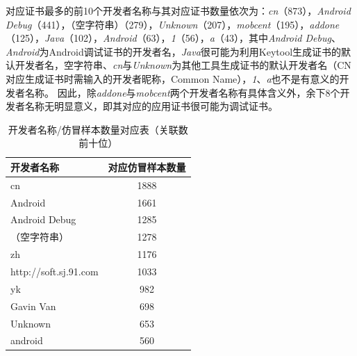 对应证书最多的前10个开发者名称与其对应证书数量依次为：\emph{cn}（873），\emph{Android Debug}（441），（空字符串）（279），\emph{Unknown}（207），\emph{mobcent}（195），\emph{addone}（125），\emph{Java}（102），\emph{Android}（63），\emph{1}（56），\emph{a}（43），其中\emph{Android Debug}、\emph{Android}为Android调试证书的开发者名，\emph{Java}很可能为利用Keytool生成证书的默认开发者名，空字符串、\emph{cn}与\emph{Unknown}为其他工具生成证书的默认开发者名（CN对应生成证书时需输入的开发者昵称，Common Name），\emph{1}、\emph{a}也不是有意义的开发者名称。
因此，除\emph{addone}与\emph{mobcent}两个开发者名称有具体含义外，余下8个开发者名称无明显意义，即其对应的应用证书很可能为调试证书。

\begin{table}[htbp]
    \renewcommand{\arraystretch}{1}
    \footnotesize
    \centering
    \caption{开发者名称/仿冒样本数量对应表（关联数前十位）}
    \vspace{1mm}
    \begin{tabular}{l c}
        \toprule
        {\bf 开发者名称}                        & {\bf 对应仿冒样本数量} \\
        \midrule
        cn                                      & 1888                   \\
        \rowcolor{gray!15}Android               & 1661                   \\
        Android Debug                           & 1285                   \\
        \rowcolor{gray!15}（空字符串）          & 1278                   \\
        zh                                      & 1176                   \\
        \rowcolor{gray!15}http://soft.sj.91.com & 1033                   \\
        yk                                      & 982                    \\
        \rowcolor{gray!15}Gavin Van             & 698                    \\
        Unknown                                 & 653                    \\
        \rowcolor{gray!15}android               & 560                    \\
        \bottomrule
    \end{tabular}
    \label{table:developer_name_sample_cnt}
\end{table}

